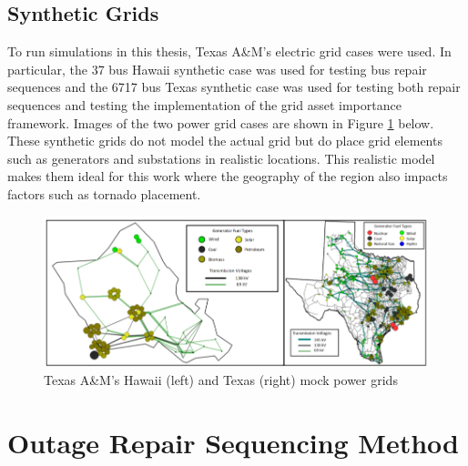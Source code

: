 \documentclass[12pt]{article}
\begin{document}
\subsection{Synthetic Grids}
To run simulations in this thesis, Texas A\&M’s electric grid cases \cite{lii} were used. In particular, the 37 bus Hawaii synthetic case was used for testing bus repair sequences and the 6717 bus Texas synthetic case was used for testing both repair sequences and testing the implementation of the grid asset importance framework. Images of the two power grid cases are shown in Figure \ref{fig:pgrids} below. These synthetic grids do not model the actual grid but do place grid elements such as generators and substations in realistic locations. This realistic model makes them ideal for this work where the geography of the region also impacts factors such as tornado placement.
\begin{figure}[ht]
    \centering %
    \includegraphics[width=\textwidth]{Mock Grids 2.png}
    \caption[Images of Texas A\&M's  Hawaii and Texas mock power grids]{Texas A\&M's  Hawaii (left) and Texas (right) mock power grids \cite{texasam}}
    \label{fig:pgrids}
\end{figure}
\newpage
\section{Outage Repair Sequencing Method} \label{Costfinding}
\end{document}

